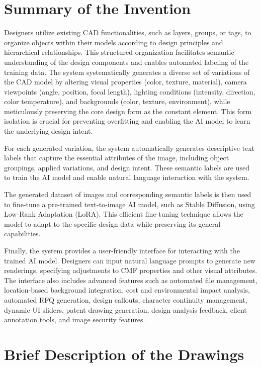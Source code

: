 \documentclass{article}
\begin{document}
\section{Summary of the Invention}

Designers utilize existing CAD functionalities, such as layers, groups, or tags, to organize objects within their models according to design principles and hierarchical relationships. This structured organization facilitates semantic understanding of the design components and enables automated labeling of the training data. The system systematically generates a diverse set of variations of the CAD model by altering visual properties (color, texture, material), camera viewpoints (angle, position, focal length), lighting conditions (intensity, direction, color temperature), and backgrounds (color, texture, environment), while meticulously preserving the core design form as the constant element. This form isolation is crucial for preventing overfitting and enabling the AI model to learn the underlying design intent.

For each generated variation, the system automatically generates descriptive text labels that capture the essential attributes of the image, including object groupings, applied variations, and design intent. These semantic labels are used to train the AI model and enable natural language interaction with the system.

The generated dataset of images and corresponding semantic labels is then used to fine-tune a pre-trained text-to-image AI model, such as Stable Diffusion, using Low-Rank Adaptation (LoRA). This efficient fine-tuning technique allows the model to adapt to the specific design data while preserving its general capabilities.

Finally, the system provides a user-friendly interface for interacting with the trained AI model. Designers can input natural language prompts to generate new renderings, specifying adjustments to CMF properties and other visual attributes. The interface also includes advanced features such as automated file management, location-based background integration, cost and environmental impact analysis, automated RFQ generation, design callouts, character continuity management, dynamic UI sliders, patent drawing generation, design analysis feedback, client annotation tools, and image security features.

\section{Brief Description of the Drawings}
\end{document}

